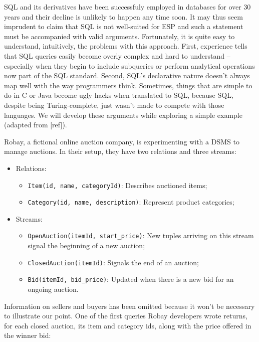 \documentclass{report}
\begin{document}
SQL and its derivatives have been successfuly employed in databases
for over 30 years and their decline is unlikely to happen any time
soon. It may thus seem imprudent to claim that SQL is not well-suited
for ESP and such a statement must be accompanied with valid
arguments. Fortunately, it is quite easy to understand, intuitively,
the problems with this approach. First, experience tells that SQL
queries easily become overly complex and hard to understand --
especially when they begin to include subqueries or perform analytical
operations now part of the SQL standard. Second, SQL's declarative
nature doesn't always map well with the way programmers
think. Sometimes, things that are simple to do in C or Java become
ugly hacks when translated to SQL, because SQL, despite being
Turing-complete, just wasn't made to compete with those languages. We
will develop these arguments while exploring a simple example (adapted
from [ref]).

Robay, a fictional online auction company, is experimenting with a
DSMS to manage auctions. In their setup, they have two relations and
three streams:

\begin{itemize}
\item Relations:
  \begin{itemize}
  \item \verb=Item(id, name, categoryId)=: Describes auctioned items;
  \item \verb=Category(id, name, description)=: Represent product categories;
  \end{itemize}
\item Streams:
  \begin{itemize}
  \item \verb=OpenAuction(itemId, start_price)=: New tuples arriving
    on this stream signal the beginning of a new auction;
  \item \verb=ClosedAuction(itemId)=: Signals the end of an auction;
  \item \verb=Bid(itemId, bid_price)=: Updated when there is a new bid
    for an ongoing auction.
  \end{itemize}
\end{itemize}

Information on sellers and buyers has been omitted because it won't be
necessary to illustrate our point. One of the first queries Robay
developers wrote returns, for each closed auction, its item and
category ids, along with the price offered in the winner bid:
\end{document}
